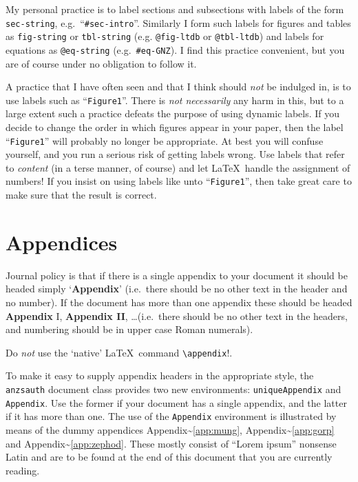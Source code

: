 \documentclass[
doublespace,
  times]{anzsauth}
\begin{document}
My personal practice is to label sections and subsections with labels of
the form \texttt{sec-string}, e.g.~``\texttt{\#sec-intro}''. Similarly I
form such labels for figures and tables as \texttt{fig-string} or
\texttt{tbl-string} (e.g. \texttt{@fig-ltdb} or \texttt{@tbl-ltdb}) and
labels for equations as \texttt{@eq-string} (e.g.~\texttt{\#eq-GNZ}). I
find this practice convenient, but you are of course under no obligation
to follow it.

A practice that I have often seen and that I think should \emph{not} be
indulged in, is to use labels such as ``\texttt{Figure1}''. There is
\emph{not necessarily} any harm in this, but to a large extent such a
practice defeats the purpose of using dynamic labels. If you decide to
change the order in which figures appear in your paper, then the label
``\texttt{Figure1}'' will probably no longer be appropriate. At best you
will confuse yourself, and you run a serious risk of getting labels
wrong. Use labels that refer to \emph{content} (in a terse manner, of
course) and let \LaTeX~handle the assignment of numbers! If you insist
on using labels like unto ``\texttt{Figure1}'', then take great care to
make sure that the result is correct.

\section{Appendices}\label{sec-append}

Journal policy is that if there is a single appendix to your document it
should be headed simply `\textbf{Appendix}' (i.e.~there should be no
other text in the header and no number). If the document has more than
one appendix these should be headed \textbf{Appendix} I,
\textbf{Appendix II}, \ldots (i.e.~there should be no other text in the
headers, and numbering should be in upper case Roman numerals).

Do \emph{not} use the `native' \LaTeX~command
\texttt{\textbackslash{}appendix}!.

To make it easy to supply appendix headers in the appropriate style, the
\texttt{anzsauth} document class provides two new environments:
\texttt{uniqueAppendix} and \texttt{Appendix}. Use the former if your
document has a single appendix, and the latter if it has more than one.
The use of the \texttt{Appendix} environment is illustrated by means of
the dummy appendices Appendix\textasciitilde{}\ref{app:mung},
Appendix\textasciitilde{}\ref{app:gorp} and
Appendix\textasciitilde{}\ref{app:zephod}. These mostly consist of
``Lorem ipsum'' nonsense Latin and are to be found at the end of this
document that you are currently reading.
\end{document}
